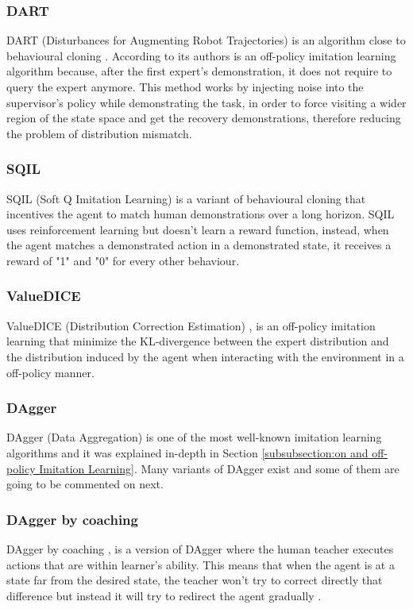 \subsubsection*{DART}
DART (Disturbances for Augmenting Robot Trajectories) \cite{DART-Laskey:2017} is an algorithm close to behavioural cloning \cite{Behavioural-Cloning-Pomerleau:1991}. According to its authors is an off-policy imitation learning algorithm because, after the first expert's demonstration, it does not require to query the expert anymore. This method works by injecting noise into the supervisor's policy while demonstrating the task, in order to force visiting a wider region of the state space and get the recovery demonstrations, therefore reducing the problem of distribution mismatch.

\subsubsection*{SQIL}
SQIL (Soft Q Imitation Learning) \cite{SQIL-Reddy-Dragan-Levine:2019} is a variant of behavioural cloning that incentives the agent to match human demonstrations over a long horizon. SQIL uses reinforcement learning but doesn't learn a reward function, instead, when the agent matches a demonstrated action in a demonstrated state, it receives a reward of "1" and "0" for every other behaviour.

\subsubsection*{ValueDICE}
ValueDICE (Distribution Correction Estimation) \cite{ValueDICE-Kostrikov:2019}, is an off-policy imitation learning \cite{Laskey:phdthesis} that minimize the KL-divergence between the expert distribution and the distribution induced by the agent when interacting with the environment in a off-policy manner.


\subsubsection*{DAgger}
DAgger (Data Aggregation) \cite{DAgger-Ross:2011} is one of the most well-known imitation learning algorithms and it was explained in-depth in Section \ref{subsubsection:on and off-policy Imitation Learning}. Many variants of DAgger exist and some of them are going to be commented on next.



\subsubsection*{DAgger by coaching}
DAgger by coaching \cite{DAgger-by-coaching-He-DaumeIII-Eisner:2012},  is a version of DAgger \cite{DAgger-Ross:2011} where the human teacher executes actions that are within learner’s ability. This means that when the agent is at a state far from the desired state, the teacher won't try to correct directly that difference but instead it will try to redirect the agent gradually \cite{Global-overview-Attia:2018}.


